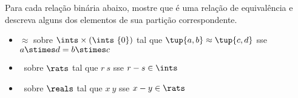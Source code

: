 \begin{exercise}
	Para cada relação binária abaixo, mostre que é uma relação de equivalência e descreva alguns dos elementos de sua partição correspondente.
	\begin{itemize}
		\item $\approx$ sobre $\ints \times (\ints \ \{0\})$ tal que $\tup{a, b} \approx \tup{c, d}$ sse $a \stimes d = b \stimes c$
		\item $~$ sobre $\rats$ tal que $r ~ s$ sse $r - s \in \ints$
		\item $~$ sobre $\reals$ tal que $x ~ y$ sse $x - y \in \rats$
	\end{itemize}
\end{exercise}